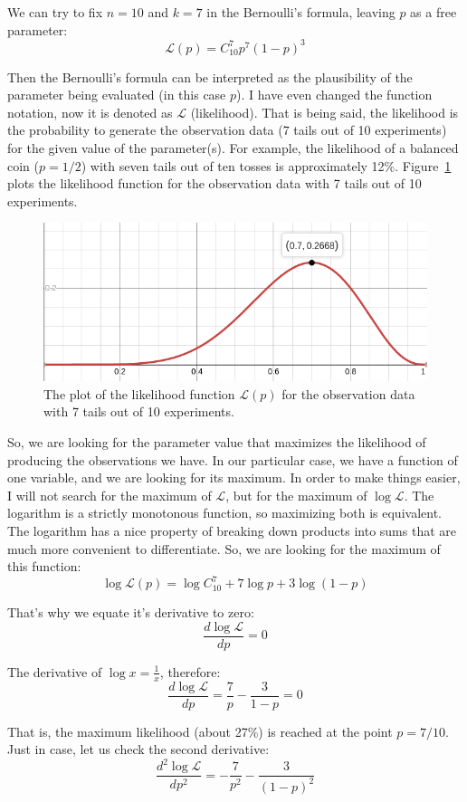 \documentclass[notitlepage,oneside]{book}
\begin{document}
We can try to fix $n=10$ and $k=7$ in the Bernoulli's formula, leaving $p$ as a free parameter:
$$\mathcal{L}(p) = C_{10}^7 p^7 (1-p)^3$$

Then the Bernoulli's formula can be interpreted as the plausibility of the parameter being evaluated (in this case $p$).
I have even changed the function notation, now it is denoted as $\mathcal L$ (likelihood).
That is being said, the likelihood is the probability to generate the observation data (7 tails out of 10 experiments) for the given value of the parameter(s).
For example, the likelihood of a balanced coin ($p=1/2$) with seven tails out of ten tosses is approximately 12\%. 
Figure~\ref{fig:likelihood} plots the likelihood function for the observation data with 7 tails out of 10 experiments.

\begin{figure}[htb!]
\centering
\includegraphics[width=.5\columnwidth]{img/likehood-07.png}
\caption{The plot of the likelihood function $\mathcal{L}(p)$ for the observation data with 7 tails out of 10 experiments.}
\label{fig:likelihood}
\end{figure}

So, we are looking for the parameter value that maximizes the likelihood of producing the observations we have.
In our particular case, we have a function of one variable, and we are looking for its maximum.
In order to make things easier, I will not search for the maximum of $\mathcal L$, but for the maximum of $\log \mathcal L$.
The logarithm is a strictly monotonous function, so maximizing both is equivalent.
The logarithm has a nice property of breaking down products into sums that are much more convenient to differentiate.
So, we are looking for the maximum of this function:
$$\log \mathcal{L}(p) = \log C_{10}^7 + 7 \log p + 3\log (1-p)$$

That's why we equate it's derivative to zero:
$$\frac{d \log \mathcal{L}}{dp} = 0$$

The derivative of $\log x = \frac{1}{x}$, therefore:
$$\frac{d \log \mathcal{L}}{dp} = \frac{7}{p} - \frac{3}{1-p} = 0$$

That is, the maximum likelihood (about 27\%) is reached at the point $p=7/10$.
Just in case, let us check the second derivative:
$$\frac{d^2 \log \mathcal{L}}{dp^2} = -\frac{7}{p^2} - \frac{3}{(1-p)^2}$$
\end{document}
